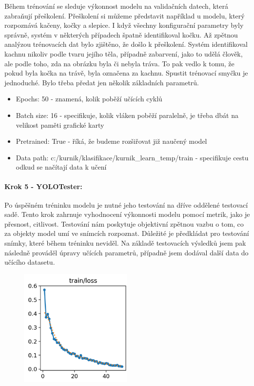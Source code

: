 Během trénování se sleduje výkonnost modelu na validačních datech, která zabraňují přeškolení.
Přeškolení si můžeme představit například u modelu, který rozpoznává kačeny, kočky a slepice.
I když všechny konfigurační parametry byly správně,  systém v některých případech špatně identifikoval kočku.
Až zpětnou analýzou trénovacích dat bylo zjištěno, že došlo k přeškolení.
Systém identifikoval kachnu nikoliv podle tvaru jejího těla, případně zabarvení, jako to udělá člověk, ale podle toho, zda na obrázku byla či nebyla tráva.
To pak vedlo k tomu, že pokud byla kočka na trávě, byla označena za kachnu.
Spustit trénovací smyčku je jednoduché.
Bylo třeba předat jen několik základních parametrů.


\begin{itemize}
    \item Epochs: 50 - znamená, kolik poběží učících cyklů
    \item Batch size: 16 - specifikuje, kolik vláken poběží paralelně, je třeba dbát na velikost paměti grafické karty
    \item Pretrained: True - říká, že budeme rozšiřovat již naučený model
    \item Data path: c:/kurnik/klasifikace/kurnik\_learn\_temp/train - specifikuje cestu odkud se načítají data k učení
\end{itemize}

\paragraph*{Krok 5 - YOLOTester:}

Po úspěšném tréninku modelu je nutné jeho testování na dříve oddělené testovací sadě.
Tento krok zahrnuje vyhodnocení výkonnosti modelu pomocí metrik, jako je přesnost, citlivost.
Testování nám poskytuje objektivní zpětnou vazbu o tom, co za objekty model umí ve snímcích rozpoznat.
Důležité je předkládat pro testování snímky, které během tréninku neviděl.
Na základě testovacích výsledků jsem pak následně prováděl úpravy učících parametrů, případně jsem dodával další data do učícího datasetu.

\begin{figure}[H]
    \centering
    \includegraphics[width=0.5\textwidth]{img/loss_funkce}
    \label{fig:loss_funkce}
\end{figure}

